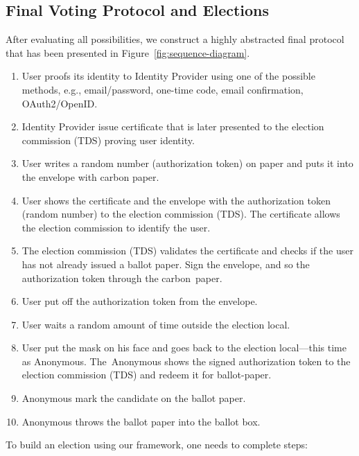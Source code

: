 \documentclass[applsci,article,accept,moreauthors,pdftex]{Definitions/mdpi}
\begin{document}
\subsection{Final Voting Protocol and Elections}
After evaluating all possibilities, we construct a highly abstracted final protocol that has been presented in Figure~\ref{fig:sequence-diagram}.
\begin{enumerate}
\item User proofs its identity to Identity Provider using one of the possible methods, e.g., email/password, one-time code, email confirmation, OAuth2/OpenID.
\item Identity Provider issue certificate that is later presented to the election commission (TDS) proving user identity.
\item User writes a random number (authorization token) on paper and puts it into the envelope with carbon paper.
\item User shows the certificate and the envelope with the authorization token (random number) to the election commission (TDS). The certificate allows the election commission to identify the user.
\item The election commission (TDS) validates the certificate and checks if the user has not already issued a ballot paper. Sign the envelope, and so the authorization token through the carbon~paper.
\item User put off the authorization token from the envelope.
\item User waits a random amount of time outside the election local.
\item User put the mask on his face and goes back to the election local––this time as Anonymous. The~Anonymous shows the signed authorization token to the election commission (TDS) and redeem it for ballot-paper.
\item Anonymous mark the candidate on the ballot paper.
\item Anonymous throws the ballot paper into the ballot box.
\end{enumerate}


To build an election using our framework, one needs to complete steps:
\end{document}

